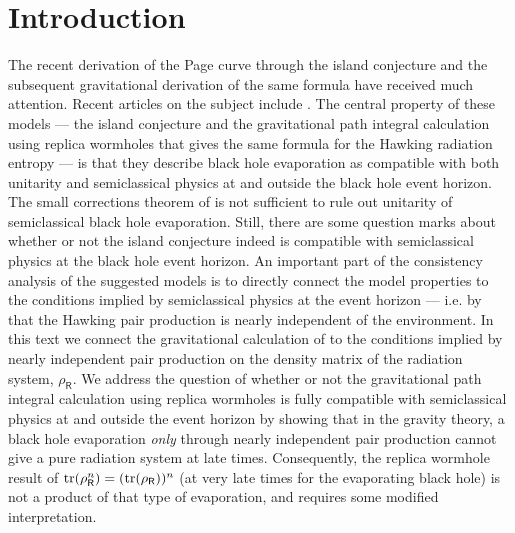 \documentclass[12pt]{article}
\numberwithin{equation}{section}
\begin{document}
\section{Introduction}
The recent derivation of the Page curve \cite{Page:1993wv,Page:2013dx} through the island conjecture \cite{Penington:2019npb,Almheiri:2019psf,Almheiri:2019hni} and the subsequent gravitational derivation of the same formula \cite{Penington:2019kki,Almheiri:2019qdq} have received much attention. Recent articles on the subject include \cite{Akers:2019nfi,Almheiri:2019yqk,Bousso:2019ykv,Almheiri:2019psy,Liu:2020gnp,Marolf:2020xie,Gautason:2020tmk,Anegawa:2020ezn,Sully:2020pza,Hartman:2020swn,Chen:2020uac,Bousso:2020kmy,Anous:2020lka,Engelhardt:2020qpv,Chen:2020tes,Hartman:2020khs,Liu:2020jsv,VanRaamsdonk:2020tlr,Akers:2020pmf,Stanford:2020wkf,Chen:2020hmv,Marolf:2020rpm,Goto:2020wnk,Colin-Ellerin:2020mva,Geng:2020fxl,Raju:2020smc}. The central property of these models --- the island conjecture and the gravitational path integral calculation using replica wormholes that gives the same formula for the Hawking radiation entropy --- is that they describe black hole evaporation as compatible with both unitarity and semiclassical physics at and outside the black hole event horizon. The small corrections theorem of \cite{Mathur:2009hf} is not sufficient to rule out unitarity of semiclassical black hole evaporation. Still, there are some question marks about whether or not the island conjecture indeed is compatible with semiclassical physics at the black hole event horizon. An important part of the consistency analysis of the suggested models is to directly connect the model properties to the conditions implied by semiclassical physics at the event horizon --- i.e. by that the Hawking pair production is nearly independent of the environment. In this text we connect the gravitational calculation of \cite{Penington:2019kki,Almheiri:2019qdq} to the conditions implied by nearly independent pair production on the density matrix of the radiation system, $\rho_\textsf{R}$. We address the question of whether or not the gravitational path integral calculation using replica wormholes is fully compatible with semiclassical physics at and outside the event horizon by showing that in the gravity theory, a black hole evaporation \emph{only} through nearly independent pair production cannot give a pure radiation system at late times. Consequently, the replica wormhole result of ${\rm tr}(\rho_\textsf{R}^n)=({\rm tr}(\rho_\textsf{R}))^n$ (at very late times for the evaporating black hole) is not a product of that type of evaporation, and requires some modified interpretation.
\end{document}
